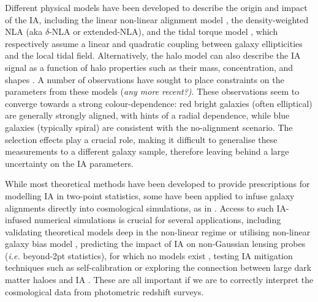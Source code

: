 Different physical models have been developed to describe the origin and impact of the IA, including the linear non-linear alignment model \citep[NLA hereafter, ][]{NLA}, the density-weighted NLA (aka $\delta$-NLA or extended-NLA), and the tidal torque model \citep[][TT hereafter]{TATT}, which respectively assume a linear and quadratic coupling between galaxy ellipticities and the local tidal field. 
Alternatively, the halo model can also describe the IA signal as a function of halo properties such as their mass, concentration, and shapes \citep{Fortuna2020}.
A number of observations have sought to place constraints on the parameters from these models \citep[\eg][]{BlueIA, Singh_IA_LOWZ, DESY1_IA_Samuroff, Johnston_IA} {(\it any more recent?)}.
These observations seem to converge towards a strong colour-dependence: red bright galaxies (often elliptical) are generally strongly aligned, with hints of a radial dependence, while blue galaxies (typically spiral) are consistent with the no-alignment scenario.
The selection effects play a crucial role, making it difficult to generalise these measurements to a different galaxy sample, therefore leaving behind a large uncertainty on the IA parameters.


While most theoretical methods have been developed to provide prescriptions for modelling IA in two-point statistics, some have been applied to infuse galaxy alignments directly into cosmological simulations, as in \citet{Fluri2019, Tidalator2D, MICE_IA, Lanzieri2023, vanAlfen2023}. 
Access to such IA-infused numerical simulations is crucial for several applications, including 
validating theoretical models deep in the non-linear regime or utilising non-linear galaxy bias model \citep{IA_gal_bias}, 
 predicting the impact of IA on non-Gaussian lensing probes ({\it i.e.} beyond-2pt statistics), for which no models exist \citep{Zuercher2020a, Tidalator2D},
testing IA mitigation techniques such as self-calibration \citep[][Bera et al in prep.]{SelfCalibrationYao1, SelfCalibrationYao2, SelCalibrationPedersen} or exploring the connection between large dark matter haloes and IA \citep{vanAlfen2023}.
{} These are all important if we are to correctly interpret the cosmological data from photometric redshift surveys. 


